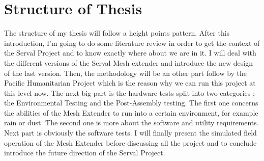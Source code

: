 \section{Structure of Thesis}
The structure of my thesis will follow a height points pattern. After this introduction, I'm going to do some literature review in order to get the context of the Serval Project and to know exactly where about we are in it. I will deal with the different versions of the Serval Mesh extender and introduce the new design of the last version. Then, the methodology will be an other part follow by the Pacific Humanitarian Project which is the reason why we can run this project at this level now. The next big part is the hardware tests split into two categories : the Environmental Testing and the Post-Assembly testing. The first one concerns the abilities of the Mesh Extender to run into a certain environment, for example rain or dust. The second one is more about the software and utility requirements. Next part is obviously the software tests. I will finally present the simulated field operation of the Mesh Extender before discussing all the project and to conclude introduce the future direction of the Serval Project.